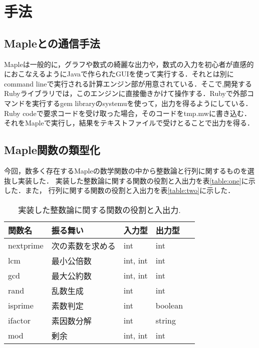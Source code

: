 \section{手法}
\subsection{Mapleとの通信手法}
Mapleは一般的に，グラフや数式の綺麗な出力や，数式の入力を初心者が直感的におこなえるようにJavaで作られたGUIを使って実行する．それとは別にcommand lineで実行される計算エンジン部が用意されている．そこで,開発するRubyライブラリでは，このエンジンに直接働きかけて操作する．Rubyで外部コマンドを実行するgem libraryのsystemuを使って，出力を得るようにしている．Ruby codeで要求コードを受け取った場合，そのコードをtmp.mwに書き込む．それをMapleで実行し，結果をテキストファイルで受けとることで出力を得る．

\subsection{Maple関数の類型化}
今回，数多く存在するMapleの数学関数の中から整数論と行列に関するものを選抜し実装した．
実装した整数論に関する関数の役割と入出力を表\ref{table:one}に示した．また，
行列に関する関数の役割と入出力を表\ref{table:two}に示した．

\begin{table}[htbp]\begin{center}
\caption{実装した整数論に関する関数の役割と入出力.}
\label{table:one}
\begin{tabular}{lllll}
\hline
関数名  &振る舞い  &入力型  &出力型  \\ \hline
nextprime  &次の素数を求める  &int  &int  \\
lcm  &最小公倍数  &int, int  &int  \\
gcd  &最大公約数  &int, int  &int  \\
rand  &乱数生成  &int  &int  \\
isprime  &素数判定  &int  &boolean  \\
ifactor  &素因数分解  &int  &string  \\
mod  &剰余  &int, int  &int  \\
\hline
\end{tabular}
\label{default}
\end{center}\end{table}

